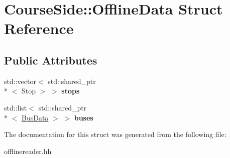 \hypertarget{structCourseSide_1_1OfflineData}{\section{Course\-Side\-:\-:Offline\-Data Struct Reference}
\label{structCourseSide_1_1OfflineData}
}
\subsection*{Public Attributes}
\begin{DoxyCompactItemize}
\item 
\hypertarget{structCourseSide_1_1OfflineData_a40f6b3c16a4dc12ae44eb1eb51a02c4c}{std\-::vector$<$ std\-::shared\-\_\-ptr\\*
$<$ Stop $>$ $>$ {\bfseries stops}}\label{structCourseSide_1_1OfflineData_a40f6b3c16a4dc12ae44eb1eb51a02c4c}

\item 
\hypertarget{structCourseSide_1_1OfflineData_a6ba9e844be97e4e91e7703c9ab4872e7}{std\-::list$<$ std\-::shared\-\_\-ptr\\*
$<$ \hyperlink{structCourseSide_1_1BusData}{Bus\-Data} $>$ $>$ {\bfseries buses}}\label{structCourseSide_1_1OfflineData_a6ba9e844be97e4e91e7703c9ab4872e7}

\end{DoxyCompactItemize}


The documentation for this struct was generated from the following file\-:\begin{DoxyCompactItemize}
\item 
offlinereader.\-hh\end{DoxyCompactItemize}
